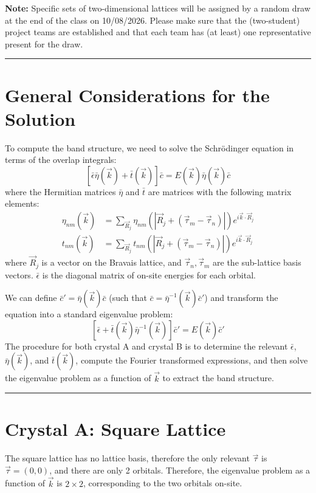 \documentclass[11pt]{article}
\begin{document}
\textbf{Note:} Specific sets of two-dimensional lattices will be assigned by a random draw at the end of the class on 10/08/2026. Please make sure that the (two-student) project teams are established and that each team has (at least) one representative present for the draw.

\bigskip
\hrule
\bigskip

\section{General Considerations for the Solution}

To compute the band structure, we need to solve the Schr\"odinger equation in terms of the overlap integrals:
\[
	[\bar{\epsilon} \bar{\eta}(\vec{k}) + \bar{t}(\vec{k})]\bar{c} = E(\vec{k}) \bar{\eta}(\vec{k}) \bar{c}
\]
where the Hermitian matrices $\bar{\eta}$ and $\bar{t}$ are matrices with the following matrix elements:
\begin{align}
	\eta_{nm}(\vec{k}) &= \sum_{\vec{R}_{j}} \eta_{nm}(|\vec{R}_{j} + (\vec{\tau}_{m} - \vec{\tau}_{n})|) e^{i \vec{k} \cdot \vec{R}_{j}} \\
	t_{nm}(\vec{k}) &= \sum_{\vec{R}_{j}} t_{nm}(|\vec{R}_{j} + (\vec{\tau}_{m} - \vec{\tau}_{n})|) e^{i \vec{k} \cdot \vec{R}_{j}}
\end{align}
where $\vec{R}_{j}$ is a vector on the Bravais lattice, and $\vec{\tau}_{n}, \vec{\tau}_{m}$ are the sub-lattice basis vectors. 
$\bar{\epsilon}$ is the diagonal matrix of on-site energies for each orbital.

We can define $\bar{c}' = \bar{\eta}(\vec{k}) \bar{c}$ (such that $\bar{c} = \bar{\eta}^{-1}(\vec{k}) \bar{c}'$) and transform the equation into a standard eigenvalue problem:
\[
	[\bar{\epsilon} + \bar{t}(\vec{k}) \bar{\eta}^{-1}(\vec{k})] \bar{c}' = E(\vec{k}) \bar{c}'
\]
The procedure for both crystal A and crystal B is to determine the relevant $\bar{\epsilon}$, $\bar{\eta}(\vec{k})$, and $\bar{t}(\vec{k})$, compute the Fourier transformed expressions, and then solve the eigenvalue problem as a function of $\vec{k}$ to extract the band structure.

\bigskip
\hrule
\bigskip

\section{Crystal A: Square Lattice}

The square lattice has no lattice basis, therefore the only relevant $\vec{\tau}$ is $\vec{\tau} = (0,0)$, and there are only 2 orbitals. Therefore, the eigenvalue problem as a function of $\vec{k}$ is $2 \times 2$, corresponding to the two orbitals on-site.
\end{document}
